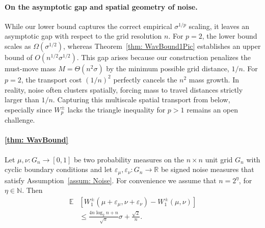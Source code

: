 \documentclass{article}
\theoremstyle{plain}
\theoremstyle{definition}
\theoremstyle{remark}
\begin{document}
\paragraph{On the asymptotic gap and spatial geometry of noise.}
While our lower bound captures the correct empirical $\sigma^{1/p}$ scaling, it leaves an asymptotic gap with respect to the grid resolution $n$. For $p=2$, the lower bound scales as $\Omega(\sigma^{1/2})$, whereas Theorem~\ref{thm: WavBound1Pic} establishes an upper bound of $O(n^{1/2}\sigma^{1/2})$. This gap arises because our construction penalizes the must-move mass $M = \Theta(n^2\sigma)$ by the minimum possible grid distance, $1/n$. For $p=2$, the transport cost $(1/n)^2$ perfectly cancels the $n^2$ mass growth. In reality, noise often clusters spatially, forcing mass to travel distances strictly larger than $1/n$. Capturing this multiscale spatial transport from below, especially since $W_p^\pm$ lacks the triangle inequality for $p>1$ remains an open challenge.


\paragraph{\cref{thm: WavBound}}
    Let $\mu, \nu:G_n \to [0,1]$ be two probability measures on the \(n \times n\) unit grid $G_n$ with cyclic boundary conditions and let
    \( \varepsilon_\mu, \varepsilon_\nu : G_n \to \mathbb{R} \) be signed noise measures that satisfy Assumption~\ref{assum: Noise}.
    For convenience we assume that $n=2^\eta$, for $\eta \in \mathbb{N}$.
    Then 
    \begin{align}
        \mathbb{E}
        &\left[
            W^\pm_1(\mu + \varepsilon_\mu,  \nu + \varepsilon_\nu) - W^\pm_1(\mu, \nu)
        \right]\\
        &\le
        \frac{4n \log_2 n + n }{\sqrt{\pi}} \sigma
        +
        \frac{\sqrt{2}}{n}.
    \end{align}
\end{document}
